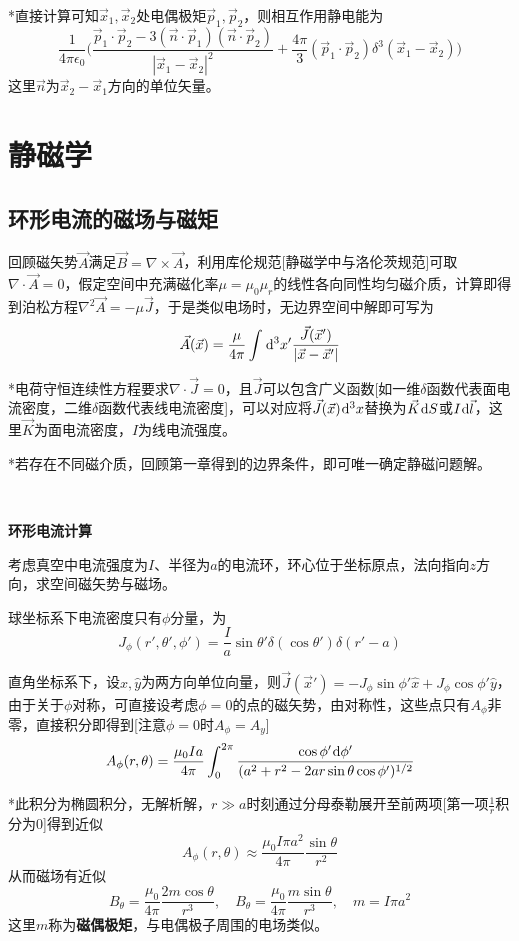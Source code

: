 \documentclass[a4paper,UTF8,fontset=windows]{ctexart}
\newcommand*{\dr}{\hspace{0.07em}\mathrm{d}}
\newcommand*{\va}{\vec{A}}
\newcommand*{\vb}{\vec{B}}
\newcommand*{\vj}{\vec{J}}
\newcommand*{\vk}{\vec{K}}
\newcommand*{\vls}{\vec{l}}
\newcommand*{\vns}{\vec{n}}
\newcommand*{\vps}{\vec{p}}
\newcommand*{\vx}{\vec{x}}
\begin{document}
*直接计算可知$\vx_1,\vx_2$处电偶极矩$\vps_1,\vps_2$，则相互作用静电能为
$$\frac{1}{4\pi\epsilon_0}\bigg(\frac{\vps_1\cdot\vps_2-3(\vns\cdot\vps_1)(\vns\cdot\vps_2)}{|\vx_1-\vx_2|^2}+\frac{4\pi}{3}(\vps_1\cdot\vps_2)\delta^3(\vx_1-\vx_2)\bigg)$$
这里$\vns$为$\vx_2-\vx_1$方向的单位矢量。

\section{静磁学}
\subsection{环形电流的磁场与磁矩}
回顾磁矢势$\va$满足$\vb=\nabla\times\va$，利用库伦规范[静磁学中与洛伦茨规范]可取$\nabla\cdot\va=0$，假定空间中充满磁化率$\mu=\mu_0\mu_r$的线性各向同性均匀磁介质，计算即得到泊松方程$\nabla^2\va=-\mu\vj$，于是类似电场时，无边界空间中解即可写为
$$\va(\vx)=\frac{\mu}{4\pi}\int\dr^3x'\frac{\vj(\vx')}{|\vx-\vx'|}$$

*电荷守恒连续性方程要求$\nabla\cdot\vj=0$，且$\vj$可以包含广义函数[如一维$\delta$函数代表面电流密度，二维$\delta$函数代表线电流密度]，可以对应将$\vj(\vx)\dr^3x$替换为$\vk\dr S$或$I\dr\vls$，这里$\vk$为面电流密度，$I$为线电流强度。

*若存在不同磁介质，回顾第一章得到的边界条件，即可唯一确定静磁问题解。

\

\textbf{环形电流计算}

考虑真空中电流强度为$I$、半径为$a$的电流环，环心位于坐标原点，法向指向$z$方向，求空间磁矢势与磁场。

球坐标系下电流密度只有$\phi$分量，为
$$J_\phi(r',\theta',\phi')=\frac{I}{a}\sin\theta'\delta(\cos\theta')\delta(r'-a)$$

直角坐标系下，设$\hat{x},\hat{y}$为两方向单位向量，则$\vj(\vx')=-J_\phi\sin\phi'\hat{x}+J_\phi\cos\phi'\hat{y}$，由于关于$\phi$对称，可直接设考虑$\phi=0$的点的磁矢势，由对称性，这些点只有$A_\phi$非零，直接积分即得到[注意$\phi=0$时$A_\phi=A_y$]
$$A_\phi(r,\theta)=\frac{\mu_0Ia}{4\pi}\int_0^{2\pi}\frac{\cos\phi'\dr\phi'}{(a^2+r^2-2ar\sin\theta\cos\phi')^{1/2}}$$

*此积分为椭圆积分，无解析解，$r\gg a$时刻通过分母泰勒展开至前两项[第一项$\frac{1}{r}$积分为0]得到近似
$$A_\phi(r,\theta)\approx\frac{\mu_0I\pi a^2}{4\pi}\frac{\sin\theta}{r^2}$$
从而磁场有近似
$$B_\theta=\frac{\mu_0}{4\pi}\frac{2m\cos\theta}{r^3},\quad B_\theta=\frac{\mu_0}{4\pi}\frac{m\sin\theta}{r^3},\quad m=I\pi a^2$$
这里$m$称为\textbf{磁偶极矩}，与电偶极子周围的电场类似。
\end{document}
